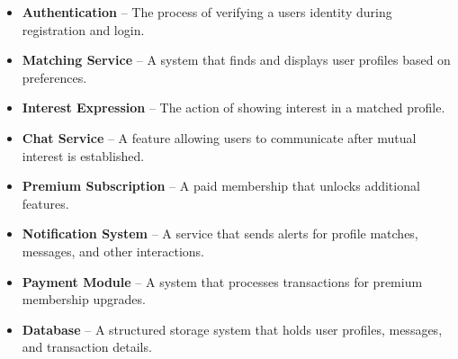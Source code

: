 \begin{itemize}
\item
  \textbf{Authentication} -- The process of verifying a
  user\textquotesingle s identity during registration and login.
\item
  \textbf{Matching Service} -- A system that finds and displays user
  profiles based on preferences.
\item
  \textbf{Interest Expression} -- The action of showing interest in a
  matched profile.
\item
  \textbf{Chat Service} -- A feature allowing users to communicate after
  mutual interest is established.
\item
  \textbf{Premium Subscription} -- A paid membership that unlocks
  additional features.
\item
  \textbf{Notification System} -- A service that sends alerts for
  profile matches, messages, and other interactions.
\item
  \textbf{Payment Module} -- A system that processes transactions for
  premium membership upgrades.
\item
  \textbf{Database} -- A structured storage system that holds user
  profiles, messages, and transaction details.
\end{itemize}
